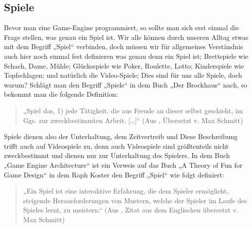 \subsection{Spiele}	

Bevor man eine Game-Engine programmiert, so sollte man sich erst einmal die Frage stellen, was genau ein Spiel ist. Wir alle können durch unseren Alltag etwas mit dem Begriff „Spiel“ verbinden, doch müssen wir für allgemeines Verständnis auch hier noch einmal fest definieren was genau denn ein Spiel ist;
Brettspiele wie Schach, Dame, Mühle; Glücksspiele wie Poker, Roulette, Lotto; Kinderspiele wie Topfschlagen; und natürlich die Video-Spiele; Dies sind für uns alle Spiele, doch warum?
Schlägt man den Begriff „Spiele“ in dem Buch „Der Brockhaus“ nach, so bekommt man die folgende Definition:

\begin{quote}
	„Spiel das, 1) jede Tätigkeit, die aus Freude an dieser selbst geschieht, im Ggs. zur zweckbestimmten Arbeit. […]“ (Aus \cite{brockhaus}, Übersetzt v. Max Schmitt)
\end{quote}

Spiele dienen also der Unterhaltung, dem Zeitvertreib und 
Diese Beschreibung trifft auch auf Videospiele zu, denn auch Videospiele sind größtenteils nicht zweckbestimmt und dienen nur zur Unterhaltung des Spielers.
In dem Buch „Game Engine Architecture“ \cite{gea} ist ein Verweis auf das Buch „A Theory
of Fun for Game Design“ in dem Raph Koster den Begriff „Spiel“ wie folgt definiert:

\begin{quote}
	„Ein Spiel ist eine interaktive Erfahrung, die dem Spieler ermöglicht, steigende Herausforderungen von Mustern, welche der Spieler im Laufe des Spieles lernt, zu meistern.“
	(Aus \cite{theoryoffun}, Zitat aus dem Englischen übersetzt v. Max Schmitt)
\end{quote}